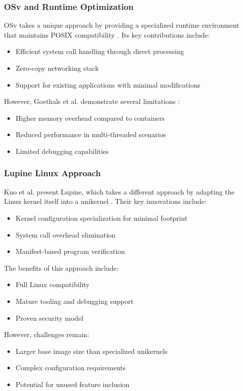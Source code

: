 \documentclass[conference]{IEEEtran}
\begin{document}
\subsubsection{OSv and Runtime Optimization}
OSv takes a unique approach by providing a specialized runtime environment that maintains POSIX compatibility \cite{unikernels_vs_containers}. Its key contributions include:
\begin{itemize}
	\item Efficient system call handling through direct processing
	\item Zero-copy networking stack
	\item Support for existing applications with minimal modifications
\end{itemize}

However, Goethals et al. demonstrate several limitations \cite{unikernels_vs_containers}:
\begin{itemize}
	\item Higher memory overhead compared to containers
	\item Reduced performance in multi-threaded scenarios
	\item Limited debugging capabilities
\end{itemize}

\subsubsection{Lupine Linux Approach}
Kuo et al. present Lupine, which takes a different approach by adapting the Linux kernel itself into a unikernel \cite{linux_kernel_clothing}. Their key innovations include:
\begin{itemize}
	\item Kernel configuration specialization for minimal footprint
	\item System call overhead elimination
	\item Manifest-based program verification
\end{itemize}

The benefits of this approach include:
\begin{itemize}
	\item Full Linux compatibility
	\item Mature tooling and debugging support
	\item Proven security model
\end{itemize}

However, challenges remain:
\begin{itemize}
	\item Larger base image size than specialized unikernels
	\item Complex configuration requirements
	\item Potential for unused feature inclusion
\end{itemize}
\end{document}
